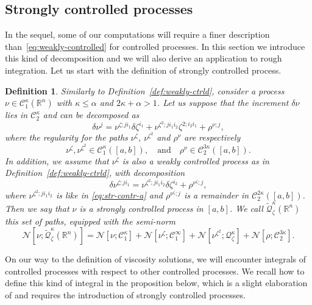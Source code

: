 \documentclass[12pt,reqno]{amsart}
\numberwithin{equation}{section}  %
\newcommand{\der}{\delta}
\newcommand{\1}{{\bf 1}}
\newcommand{\2}{{\bf 2}}
\newcommand{\bzeta}{{\zeta}}
\newcommand{\R}{\mathbb R}
\newcommand{\cac}{\mathcal C}
\newcommand{\cn}{\mathcal N}
\newcommand{\cq}{\mathcal Q}
\newcommand{\al}{\alpha}
\newcommand{\ka}{\kappa}
\newtheorem{definition}[theorem]{Definition}
\theoremstyle{remark}
\theoremstyle{remark}
\newcommand{\beq}{\begin{equation}}
\newcommand{\eeq}{\end{equation}}
\begin{document}
\subsection{Strongly controlled processes}\label{sec:strongProcess}

In the sequel, some of our computations will require a finer description than~\eqref{eq:weakly-controlled} for controlled processes. In this section we introduce this kind of decomposition and we will also derive an application to rough integration.
Let us start with the definition of strongly controlled process. 
\begin{definition}\label{def:str-contr}
Similarly to Definition~\ref{def:weakly-ctrld}, consider a process $\nu \in \cac_1^{\ka}(\R^n)$ with $\ka \leq \al$ and $2\ka+\al > 1$. Let us suppose that the increment $\der \nu$ lies in $\cac_2^{\ka}$ and can be decomposed as 
\beq\label{eq:str-contr-a}
\der \nu^j = \nu^{\zeta;j i_1} \der \zeta^{i_1} + \nu^{\bzeta^{2}; j i_1 i_2} \bzeta^{2; i_2 i_1} + \rho^{\nu;j},
\eeq
where the regularity for the paths $\nu^{\zeta}$, $\nu^{\bzeta^2}$ and $\rho^{\nu}$ are respectively
\beq\label{eq:str-contr-b}
\nu^{\zeta}, \nu^{\bzeta^2} \in \cac_1^{\ka}([a,b]), \quad\text{and}\quad \rho^{\nu} \in \cac_2^{3\ka}([a,b]).
\eeq
In addition, we assume that $\nu^{\zeta}$ is also a weakly controlled process as in Definition~\ref{def:weakly-ctrld}, with decomposition
\beq\label{eq:str-contr-l}
\der \nu^{\zeta; ji_1} = \nu^{\zeta^{2}; j i_1 i_2} \der \zeta^{i_2} + \rho^{\nu^{\zeta};j},
\eeq
where $\nu^{\zeta^{2}; j i_1 i_2}$ is like in \eqref{eq:str-contr-a} and $\rho^{\nu^{\zeta}; j}$ is a remainder in $\cac_2^{2\ka}([a,b])$. Then we say that $\nu$ is a strongly controlled process in $[a,b]$. We call $\tilde{\cq}_{\zeta}^{\ka}(\R^n)$ this set of paths, equipped with the semi-norm
$$
\cn[\nu; \tilde{\cq}_{\zeta}^{\ka}(\R^n)] = \cn[\nu;\cac_1^{\ka}] + \cn[\nu^{\zeta};\cac_1^{\infty}] + \cn[\nu^{\zeta^{2}}; \cq_{\zeta}^{\ka}] + \cn[\rho;\cac_2^{3\ka}].
$$
\end{definition}


On our way to the definition of viscosity solutions, we will encounter integrals of controlled processes with respect to other controlled processes. We recall how to define this kind of integral in the proposition below, which is a slight elaboration of \cite[Theorem~1]{gubinelli} and requires the introduction of strongly controlled processes. 
\end{document}
